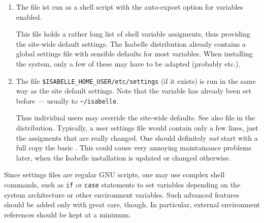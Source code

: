 \begin{isabellebody}
\begin{isamarkuptext}
\begin{enumerate}
  \item The file \hyperlink{file.$ISABELLE-HOME/etc/settings}{\mbox{}} ist run as a
  \hyperlink{executable.bash}{\mbox{}} shell script with the auto-export option for
  variables enabled.
  
  This file holds a rather long list of shell variable assigments,
  thus providing the site-wide default settings.  The Isabelle
  distribution already contains a global settings file with sensible
  defaults for most variables.  When installing the system, only a few
  of these may have to be adapted (probably \hyperlink{setting.ML-SYSTEM}{\mbox{}}
  etc.).
  
  \item The file \verb|$ISABELLE_HOME_USER/etc/settings| (if it
  exists) is run in the same way as the site default settings. Note
  that the variable \hyperlink{setting.ISABELLE-HOME-USER}{\mbox{}} has already been set
  before --- usually to \verb|~/isabelle|.
  
  Thus individual users may override the site-wide defaults.  See also
  file \hyperlink{file.$ISABELLE-HOME/etc/user-settings.sample}{\mbox{}} in the
  distribution.  Typically, a user settings file would contain only a
  few lines, just the assigments that are really changed.  One should
  definitely \emph{not} start with a full copy the basic \hyperlink{file.$ISABELLE-HOME/etc/settings}{\mbox{}}. This could cause very annoying
  maintainance problems later, when the Isabelle installation is
  updated or changed otherwise.
  
  \end{enumerate}

  Since settings files are regular GNU \hypertarget{executable.bash}{\hyperlink{executable.bash}{\mbox{}}} scripts,
  one may use complex shell commands, such as \verb|if| or
  \verb|case| statements to set variables depending on the
  system architecture or other environment variables.  Such advanced
  features should be added only with great care, though. In
  particular, external environment references should be kept at a
  minimum.


\end{isamarkuptext}
\end{isabellebody}

